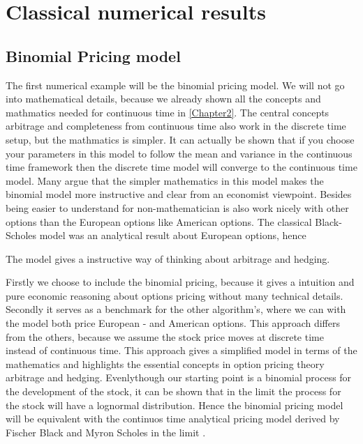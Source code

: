 
\chapter{Classical numerical results} %

\label{Chapter3} %



\section{Binomial Pricing model}
The first numerical example will be the binomial pricing model. We will not go into mathematical details, because we already shown all the concepts and mathmatics needed for continuous time in \ref{Chapter2}. The central concepts arbitrage and completeness from continuous time also work in the discrete time setup, but the mathmatics is simpler. It can actually be shown that if you choose your parameters in this model to follow the mean and variance in the continuous time framework then the discrete time model will converge to the continuous time model. Many argue that the simpler mathematics in this model makes the binomial model more instructive and clear from an economist viewpoint. Besides being easier to understand for non-mathematician is also work nicely with other options than the European options like American options. The classical Black-Scholes model was an analytical result about European options, hence  



The model gives a instructive way of thinking about arbitrage and hedging. 

 Firstly we choose to include the binomial pricing, because it gives a intuition and pure economic reasoning about options pricing without many technical details. Secondly it serves as a benchmark for the other algorithm's, where we can with the model both price European - and American options. This approach differs from the others, because we assume the stock price moves at discrete time instead of continuous time. This approach gives a simplified model in terms of the mathematics and highlights the essential concepts in option pricing theory arbitrage and hedging. Evenlythough our starting point is a binomial process for the development of the stock, it can be shown that in the limit the process for the stock will have a lognormal distribution. Hence the binomial pricing model will be equivalent with the continuos time analytical pricing model derived by Fischer Black and Myron Scholes in the limit \parencite{binomial-Paper}
.

